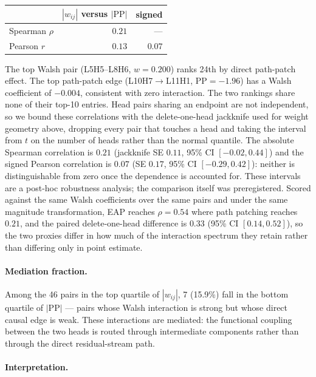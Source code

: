 \documentclass{article}
\begin{document}
\medskip

\begin{tabular}{lrr}
\toprule
 & $|w_{ij}|$ versus $|\text{PP}|$ & signed \\
\midrule
Spearman $\rho$  & $0.21$ & --- \\
Pearson $r$      & $0.13$ & $0.07$ \\
\bottomrule
\end{tabular}

\medskip

The top Walsh pair (L5H5--L8H6, $w = 0.200$) ranks 24th by direct
path-patch effect. The top path-patch edge (L10H7$\to$L11H1,
$\text{PP} = -1.96$) has a Walsh coefficient of $-0.004$, consistent
with zero interaction. The two rankings share none of their top-10 entries. Head pairs sharing an endpoint are not independent, so we bound these correlations with the delete-one-head jackknife used for weight geometry above, dropping every pair that touches a head and taking the interval from $t$ on the number of heads rather than the normal quantile. The absolute Spearman correlation is $0.21$ (jackknife SE $0.11$, 95\% CI $[-0.02, 0.44]$) and the signed Pearson correlation is $0.07$ (SE $0.17$, 95\% CI $[-0.29, 0.42]$): neither is distinguishable from zero once the dependence is accounted for. These intervals are a post-hoc robustness analysis; the comparison itself was preregistered. Scored against the same Walsh coefficients over the same pairs and under the same magnitude transformation, EAP reaches $\rho = 0.54$ where path patching reaches $0.21$, and the paired delete-one-head difference is $0.33$ (95\% CI $[0.14, 0.52]$), so the two proxies differ in how much of the interaction spectrum they retain rather than differing only in point estimate.

\paragraph{Mediation fraction.}

Among the 46 pairs in the top quartile of $|w_{ij}|$, 7 (15.9\%) fall
in the bottom quartile of $|\text{PP}|$ --- pairs whose Walsh interaction
is strong but whose direct causal edge is weak. These interactions are
mediated: the functional coupling between the two heads is routed through
intermediate components rather than through the direct residual-stream
path.

\paragraph{Interpretation.}
\end{document}
